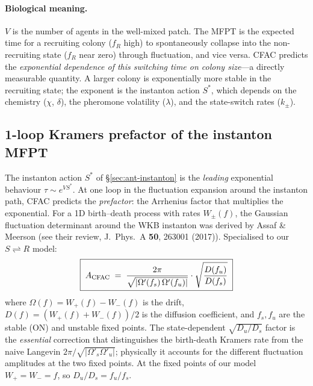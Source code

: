 \documentclass[10pt,a4paper,twocolumn]{article}
\theoremstyle{definition}
\begin{document}
\paragraph{Biological meaning.}
$V$ is the number of agents in the well-mixed patch.  The MFPT
is the expected time for a recruiting colony ($f_R$ high) to
spontaneously collapse into the non-recruiting state ($f_R$
near zero) through fluctuation, and vice versa.  CFAC predicts
the \emph{exponential dependence of this switching time on
colony size}---a directly measurable quantity.  A larger colony
is exponentially more stable in the recruiting state; the
exponent is the instanton action $S^*$, which depends on the
chemistry ($\chi$, $\delta$), the pheromone volatility
($\lambda$), and the state-switch rates ($k_\pm$).

\subsection{1-loop Kramers prefactor of the instanton MFPT}
\label{sec:ant-kramers}

The instanton action $S^*$ of \S\ref{sec:ant-instanton} is the
\emph{leading} exponential behaviour $\tau \sim e^{V S^*}$.
At one loop in the fluctuation expansion around the instanton
path, CFAC predicts the \emph{prefactor}: the Arrhenius factor
that multiplies the exponential.  For a 1D birth--death process
with rates $W_\pm(f)$, the Gaussian fluctuation determinant
around the WKB instanton was derived by Assaf \& Meerson
(see their review, J.\ Phys.\ A \textbf{50}, 263001 (2017)).
Specialised to our $S\rightleftharpoons R$ model:
\begin{equation}\label{eq:kramers-prefactor}
  \boxed{\;
  A_{\rm CFAC}
  \;=\; \frac{2\pi}{\sqrt{|\Omega'(f_s)\,\Omega'(f_u)|}}
        \cdot \sqrt{\frac{D(f_u)}{D(f_s)}}
  \;}
\end{equation}
where $\Omega(f) = W_+(f)-W_-(f)$ is the drift,
$D(f) = (W_+(f)+W_-(f))/2$ is the diffusion coefficient, and
$f_s, f_u$ are the stable (ON) and unstable fixed points.
The state-dependent $\sqrt{D_u/D_s}$ factor is the
\emph{essential} correction that distinguishes the birth-death
Kramers rate from the naive Langevin
$2\pi/\sqrt{|\Omega'_s\Omega'_u|}$; physically it accounts for
the different fluctuation amplitudes at the two fixed points.
At the fixed points of our model $W_+ = W_- = f$, so
$D_u/D_s = f_u/f_s$.
\end{document}
